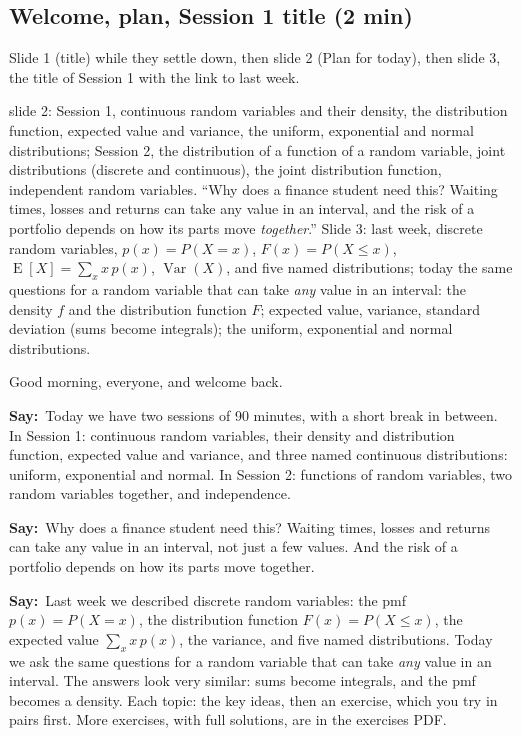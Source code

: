\documentclass[11pt,a4paper,parskip=half]{scrartcl}
\newcommand{\E}{\operatorname{E}}
\newcommand{\Var}{\operatorname{Var}}
\newcommand{\say}{\textbf{\color{teal}Say:}\ }
\begin{document}
\begin{printskip}
	\subsection{Welcome, plan, Session 1 title (2 min)}

	\begin{slidecue}
		Slide 1 (title) while they settle down, then slide 2 (Plan for
		today), then slide 3, the title of Session 1 with the link to last
		week.
	\end{slidecue}

	\begin{onslide}
		slide 2: Session 1, continuous random variables and their density, the
		distribution function, expected value and variance, the uniform,
		exponential and normal distributions; Session 2, the distribution of a
		function of a random variable, joint distributions (discrete and
		continuous), the joint distribution function, independent random
		variables. ``Why does a finance student need this? Waiting times,
		losses and returns can take any value in an interval, and the risk of
		a portfolio depends on how its parts move \emph{together}.''
		Slide 3: last week, discrete random variables, $p(x)=P(X=x)$,
		$F(x)=P(X\le x)$, $\E[X]=\sum_x x\,p(x)$, $\Var(X)$, and five named
		distributions; today the same questions for a random variable that
		can take \emph{any} value in an interval: the density $f$ and the
		distribution function $F$; expected value, variance, standard
		deviation (sums become integrals); the uniform, exponential and normal
		distributions.
	\end{onslide}

	Good morning, everyone, and welcome back.

	\say Today we have two sessions of 90 minutes, with a short break in
	between. In Session 1: continuous random variables, their density and
	distribution function, expected value and variance, and three named
	continuous distributions: uniform, exponential and normal. In Session 2:
	functions of random variables, two random variables together, and
	independence.

	\say Why does a finance student need this? Waiting times, losses and
	returns can take any value in an interval, not just a few values. And the
	risk of a portfolio depends on how its parts move together.

	\say Last week we described discrete random variables: the pmf
	$p(x)=P(X=x)$, the distribution function $F(x)=P(X\le x)$, the expected
	value $\sum_x x\,p(x)$, the variance, and five named distributions. Today
	we ask the same questions for a random variable that can take
	\emph{any} value in an interval. The answers look very similar: sums
	become integrals, and the pmf becomes a density. Each topic: the key
	ideas, then an exercise, which you try in pairs first. More exercises,
	with full solutions, are in the exercises PDF.
\end{printskip}
\end{document}
